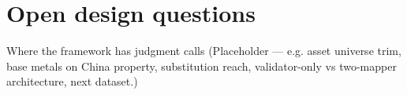 \documentclass[10pt,aspectratio=169]{beamer}
\begin{document}
\section{Open design questions}

\begin{frame}{Where the framework has judgment calls}
  \small
  (Placeholder --- e.g. asset universe trim, base metals on China property,
  substitution reach, validator-only vs two-mapper architecture, next dataset.)
\end{frame}
\end{document}
